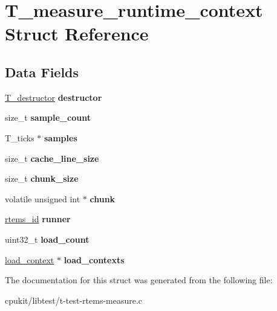 \hypertarget{structT__measure__runtime__context}{}\section{T\+\_\+measure\+\_\+runtime\+\_\+context Struct Reference}
\label{structT__measure__runtime__context}
\subsection*{Data Fields}
\begin{DoxyCompactItemize}
\item 
\mbox{\label{structT__measure__runtime__context_a5d4e3c95eac67c06b896cfab52484daf}} 
\mbox{\hyperlink{structT__destructor}{T\+\_\+destructor}} {\bfseries destructor}
\item 
\mbox{\label{structT__measure__runtime__context_a773a9138ae619a055547ac6c4a45d985}} 
size\+\_\+t {\bfseries sample\+\_\+count}
\item 
\mbox{\label{structT__measure__runtime__context_a4fb0153a14923f08173cc3e1918bec0a}} 
T\+\_\+ticks $\ast$ {\bfseries samples}
\item 
\mbox{\label{structT__measure__runtime__context_a55aa987e56d0c3957fe463ef5cf48b0e}} 
size\+\_\+t {\bfseries cache\+\_\+line\+\_\+size}
\item 
\mbox{\label{structT__measure__runtime__context_a9a3beab97fdcda308b025b0c920a1a63}} 
size\+\_\+t {\bfseries chunk\+\_\+size}
\item 
\mbox{\label{structT__measure__runtime__context_af025dbd0e813a00a390e9ad1f75c0c37}} 
volatile unsigned int $\ast$ {\bfseries chunk}
\item 
\mbox{\label{structT__measure__runtime__context_a38bad5f97202a1057c0fcab65dd3d866}} 
\mbox{\hyperlink{group__ClassicTasks_gab20892b814dced7dd4e5b9bf42becd57}{rtems\+\_\+id}} {\bfseries runner}
\item 
\mbox{\label{structT__measure__runtime__context_adbf5850ed4ad2bba83cee58088f218e9}} 
uint32\+\_\+t {\bfseries load\+\_\+count}
\item 
\mbox{\label{structT__measure__runtime__context_adaae5b4a890e2982d15cba6a30fa6026}} 
\mbox{\hyperlink{structload__context}{load\+\_\+context}} $\ast$ {\bfseries load\+\_\+contexts}
\end{DoxyCompactItemize}


The documentation for this struct was generated from the following file\+:\begin{DoxyCompactItemize}
\item 
cpukit/libtest/t-\/test-\/rtems-\/measure.\+c\end{DoxyCompactItemize}
